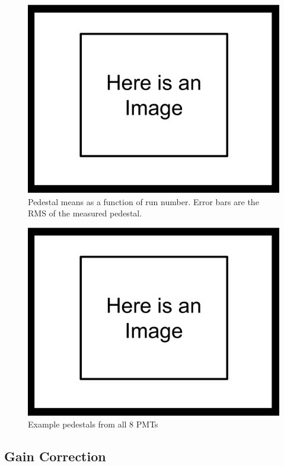 \begin{figure}[h] \label{fig:peds_timeDep}
\centering
\includegraphics[scale=.25]{3-UCNAAnalysis/ImageHolder.pdf}
\caption{Pedestal means as a function of run number. Error bars are the
RMS of the measured pedestal. }
\end{figure}

\begin{figure}[h] \label{fig:peds_timeDep}
\centering
\includegraphics[scale=.25]{3-UCNAAnalysis/ImageHolder.pdf}
\caption{Example pedestals from all 8 PMTs}
\end{figure}

\subsection{Gain Correction}

